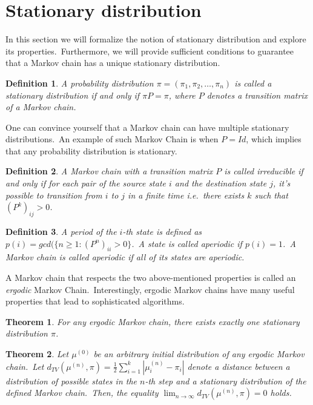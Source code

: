 \documentclass[shortabstract, english, lic]{iithesis}
\theoremstyle{default_theorem_style}\newtheorem{theorem}{Theorem}
\theoremstyle{default_theorem_style}\newtheorem{definition}{Definition}
\begin{document}
\section{Stationary distribution}

In this section we will formalize the notion of stationary distribution and explore its properties.\ Furthermore,
we will provide sufficient conditions to guarantee that a Markov chain has a unique stationary distribution.

\begin{definition}
A probability distribution $\pi = (\pi_1, \pi_2, \dots, \pi_n)$ is called a \textit{stationary} distribution if and only if
$\pi P = \pi$, where $P$ denotes a transition matrix of a Markov chain.
\end{definition}

\noindent One can convince yourself that a Markov chain can have multiple stationary distributions.\ An example of
such Markov Chain is when $P = Id$, which implies that any probability distribution is stationary.

\begin{definition}
A Markov chain with a transition matrix $P$ is called \textit{irreducible} if and only if for each pair of the source
state $i$ and the destination state $j$, it's possible to transition from $i$ to $j$ in a finite time i.e.\ there
exists $k$ such that $(P^k)_{ij} > 0$.
\end{definition}

\begin{definition}
A period of the $i$-th state is defined as $p(i) = gcd(\{n \geq 1 : (P^n)_{ii} > 0\}$.\ A state is called
\textit{aperiodic} if $p(i) = 1$.\ A Markov chain is called aperiodic if all of its states are aperiodic.
\end{definition}

\noindent A Markov chain that respects the two above-mentioned properties is called an \textit{ergodic} Markov
Chain.\ Interestingly, ergodic Markov chains have many useful properties that lead to sophisticated algorithms.

\begin{theorem}\label{thm:one_stationary}
For any ergodic Markov chain, there exists exactly one stationary distribution $\pi$.
\end{theorem}

\begin{theorem}\label{thm:converges_to_stationary}
Let $\mu^{(0)}$ be an arbitrary initial distribution of any ergodic Markov chain.\ Let
$d_{TV}(\mu^{(n)}, \pi) = \frac{1}{2} \sum_{i = 1}^{k} |\mu_i^{(n)} - \pi_i|$ denote a distance between a
distribution of possible states in the $n$-th step and a stationary distribution of the defined Markov chain.\ Then,
the equality $\lim_{n \to \infty} d_{TV}(\mu^{(n)}, \pi) = 0$ holds.
\end{theorem}
\end{document}
